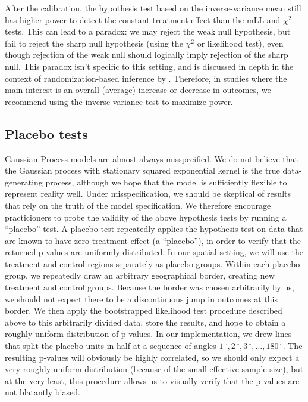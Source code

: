 \documentclass[letter]{article}
\newcommand{\degree}{{\,^\circ}}
\renewcommand{\cite}[1]{\citep{#1}}
\begin{document}
After the calibration, the hypothesis test based on the inverse-variance mean still has higher power to detect the constant treatment effect than the mLL and \(\chi^2\) tests.
This can lead to a paradox: we may reject the weak null hypothesis, but fail to reject the sharp null hypothesis (using the \(\chi^2\) or likelihood test), even though rejection of the weak null should logically imply rejection of the sharp null.
This paradox isn't specific to this setting, and is discussed in depth in the context of randomization-based inference by \cite{Ding:2014sf}. Therefore, in studies where the main interest is an overall (average) increase or decrease in outcomes, we recommend using the inverse-variance test to maximize power.
    


    	\subsection{Placebo tests}\label{placebo-tests}
    

\label{sec:placebo}
    	Gaussian Process models are almost always misspecified.
We do not believe that the Gaussian process with stationary squared exponential kernel is the true data-generating process, although we hope that the model is sufficiently flexible to represent reality well.
Under misspecification, we should be skeptical of results that rely on the truth of the model specification.
We therefore encourage practicioners to probe the validity of the above hypothesis tests by running a ``placebo'' test.
A placebo test repeatedly applies the hypothesis test on data that are known to have zero treatment effect (a ``placebo''),
in order to verify that the returned p-values are uniformly distributed.
In our spatial setting, we will use the treatment and control regions separately as placebo groups.
Within each placebo group, we repeatedly draw an arbitrary geographical border, creating new treatment and control groups.
Because the border was chosen arbitrarily by us, we should not expect there to be a discontinuous jump in outcomes at this border.
We then apply the bootstrapped likelihood test procedure described above to this arbitrarily divided data, store the results, and hope to obtain a roughly uniform distribution of p-values.
In our implementation, we drew lines that split the placebo units in half at a sequence of angles \(1\degree,2\degree,3\degree,\ldots,180\degree\).
The resulting p-values will obviously be highly correlated, so we should only expect a very roughly uniform distribution (because of the small effective sample size), but at the very least, this procedure allows us to visually verify that the p-values are not blatantly biased.
    
\end{document}
